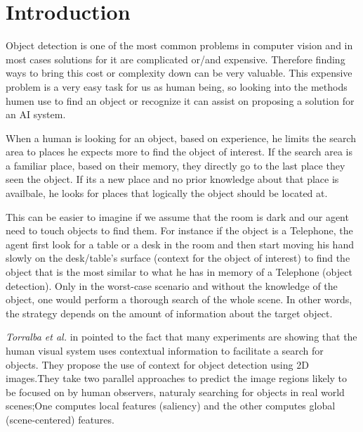 \chapter{Introduction}
\label{Introduction.ch}
 Object detection is one of the most common problems in computer vision and in most cases solutions for it are complicated or/and expensive. Therefore finding ways to bring this cost or complexity down can be very valuable. This expensive problem is a very easy task for us as human being, so looking into the methods humen use to find an object or recognize it can assist on proposing a solution for an AI system.
 
When a human is looking for an object, based on experience, he limits the search area to places he expects more to find the object of interest. If the search area is a familiar place, based on their memory, they directly go to the last place they seen the object. If its a new place and no prior knowledge about that place is availbale, he looks for places that logically the object should be located at. 

This can be easier to imagine if we assume that the room is dark and our agent need to touch objects to find them. For instance if the object is a Telephone, the agent first look for a table or a desk in the room and then start moving his hand slowly on the desk/table's surface (context for the object of interest) to find the object that is the most similar to what he has in memory of a Telephone (object detection). 
Only in the worst-case scenario and without the knowledge of the object, one would perform a thorough search of the 
whole scene.
In other words, the strategy depends on the amount of information about the target object.



{\it Torralba et al.} in \cite{eyeMovement} pointed to the fact that many experiments are showing that the human visual system uses 
contextual information to facilitate a search for objects. They propose the use of context for object detection using 2D images.They take two parallel approaches to predict the image regions likely to be focused on by human observers, naturaly searching for objects in real world scenes;One computes local features (saliency) and the other computes global (scene-centered) features.

